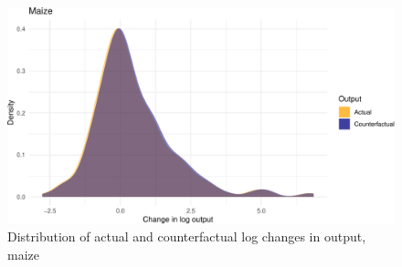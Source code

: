 \documentclass[
]{article}
\begin{document}
\begin{landscape}
\begin{figure}
\includegraphics{draft_files/figure-latex/yield9counterfactual3-1} \caption[Distribution of actual and counterfactual log changes in output, maize]{Distribution of actual and counterfactual log changes in output, maize}\label{fig:yield9counterfactual3}
\end{figure}
\end{landscape}
\end{document}
